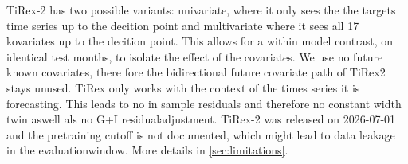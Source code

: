 
TiRex-2 has two possible variants: univariate, where it only sees the the targets time series up to the decition point and multivariate where it sees all 17 kovariates up to the decition point. This allows for a within model contrast, on identical test months, to isolate the effect of the covariates. We use no future known covariates, there fore the bidirectional future covariate path of TiRex2 stays unused. TiRex only works with the context of the times series it is forecasting. This leads to no in sample residuals and therefore no constant width twin aswell als no G+I residualadjustment. TiRex-2 was released on 2026-07-01 and the pretraining cutoff is not documented, which might lead to data leakage in the evaluationwindow. More details in \ref{sec:limitations}.

